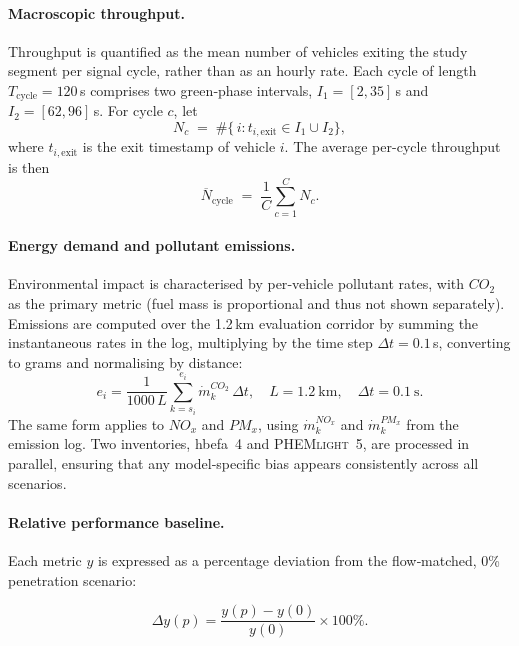 \paragraph{Macroscopic throughput.}
Throughput is quantified as the mean number of vehicles exiting the study segment per signal cycle, rather than as an hourly rate. Each cycle of length $T_{\mathrm{cycle}}=120\,$s comprises two green‐phase intervals, $I_{1}=[2,35]\,$s and $I_{2}=[62,96]\,$s. For cycle $c$, let
\begin{equation}
    N_{c} \;=\; \#\bigl\{\,i : t_{i,\mathrm{exit}}\in I_{1}\cup I_{2}\bigr\},
\end{equation}
where $t_{i,\mathrm{exit}}$ is the exit timestamp of vehicle $i$. The average per-cycle throughput is then
\begin{equation}
    \overline{N}_{\mathrm{cycle}}\;=\;\frac{1}{C}\sum_{c=1}^{C}N_{c}.
\end{equation}

\paragraph{Energy demand and pollutant emissions.}
Environmental impact is characterised by per‐vehicle pollutant rates, with $CO_{2}$ as the primary metric (fuel mass is proportional and thus not shown separately). Emissions are computed over the 1.2\,km evaluation corridor by summing the instantaneous rates in the log, multiplying by the time step $\Delta t = 0.1\,$s, converting to grams and normalising by distance:
\begin{equation}
    e_{i}
    = \frac{1}{1000\,L} \sum_{k=s_i}^{e_i} \dot m^{CO_{2}}_{k}\,\Delta t,
    \quad
    L = 1.2\ \mathrm{km},
    \quad
    \Delta t = 0.1\ \mathrm{s}.
\end{equation}
The same form applies to $NO_{x}$ and $PM_{x}$, using $\dot m^{NO_{x}}_{k}$ and $\dot m^{PM_{x}}_{k}$ from the emission log. Two inventories, \ac{hbefa}~4 and \textsc{PHEMlight}~5, are processed in parallel, ensuring that any model‐specific bias appears consistently across all scenarios. 

\paragraph{Relative performance baseline.}
Each metric $y$ is expressed as a percentage deviation from the flow‐matched, 0\% penetration scenario:

\begin{equation}
    \Delta y(p) = \frac{y(p) - y(0)}{y(0)} \times 100\%.
\end{equation}

